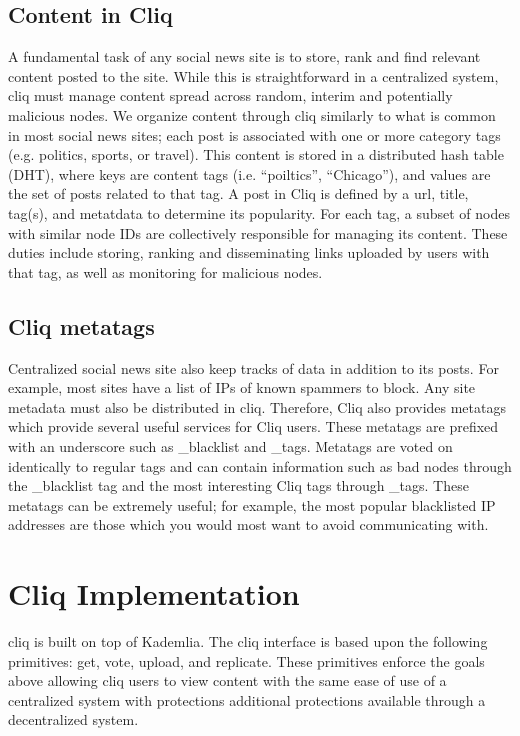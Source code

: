 \documentclass{sig-alternate}
\begin{document}
\subsection{Content in Cliq}
A fundamental task of any social news site is to store, rank and find relevant content posted to the site. While this is straightforward in a centralized system, cliq must manage content spread across random, interim and potentially malicious nodes.
We organize content through cliq similarly to what is common in most social news sites; each 
post is associated with one or more category tags (e.g. politics, sports, or travel). 
This content is stored in a distributed hash table (DHT), where keys are content tags (i.e. ``poiltics'', ``Chicago''), and values are the set of posts related to that tag. A post in Cliq is defined by a url, title, tag(s), and metatdata to determine its popularity. For each tag, a subset of nodes with similar node IDs are collectively responsible for managing its content. These duties include storing, ranking and disseminating links uploaded by users with that tag, as well as monitoring for malicious nodes.

\subsection{Cliq metatags}

Centralized social news site also keep tracks of data in addition to its posts. For example, most sites have a list of IPs of known spammers to block. Any site metadata must also be distributed in cliq. Therefore, Cliq also provides metatags which provide several useful services for Cliq users. These metatags are prefixed with an underscore such as \_blacklist and \_tags. 
Metatags are voted on identically to regular tags and can contain information such as bad nodes through the \_blacklist tag and the most interesting Cliq tags through \_tags. 
These metatags can be extremely useful; for example, the most popular blacklisted IP addresses are those which you would most want to avoid communicating with. 

\section{Cliq Implementation}

cliq is built on top of Kademlia. The cliq interface is based upon the
following primitives: get, vote, upload, and replicate.  These
primitives enforce the goals above allowing cliq users to view content
with the same ease of use of a centralized system with protections
additional protections available through a decentralized system.
\end{document}
